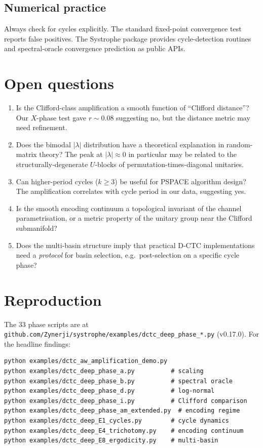 \documentclass[11pt,a4paper]{article}
\begin{document}
\subsection{Numerical practice}

Always check for cycles explicitly. The standard fixed-point
convergence test reports false positives. The Systrophe package
provides cycle-detection routines and spectral-oracle convergence
prediction as public APIs.

\section{Open questions}

\begin{enumerate}
\item Is the Clifford-class amplification a smooth function of
``Clifford distance''? Our $X$-phase test gave $r \sim 0.08$
suggesting no, but the distance metric may need refinement.

\item Does the bimodal $|\lambda|$ distribution have a theoretical
explanation in random-matrix theory? The peak at $|\lambda| \approx 0$
in particular may be related to the structurally-degenerate
$U$-blocks of permutation-times-diagonal unitaries.

\item Can higher-period cycles ($k \ge 3$) be useful for PSPACE
algorithm design? The amplification correlates with cycle period in
our data, suggesting yes.

\item Is the smooth encoding continuum a topological invariant of
the channel parametrisation, or a metric property of the unitary
group near the Clifford submanifold?

\item Does the multi-basin structure imply that practical D-CTC
implementations need a \emph{protocol} for basin selection, e.g.\
post-selection on a specific cycle phase?
\end{enumerate}

\section{Reproduction}

The 33 phase scripts are at
\texttt{github.com/Zynerji/systrophe/examples/dctc\_deep\_phase\_*.py}
(v0.17.0). For the headline findings:

\begin{verbatim}
python examples/dctc_aw_amplification_demo.py
python examples/dctc_deep_phase_a.py          # scaling
python examples/dctc_deep_phase_b.py          # spectral oracle
python examples/dctc_deep_phase_d.py          # log-normal
python examples/dctc_deep_phase_i.py          # Clifford comparison
python examples/dctc_deep_phase_am_extended.py  # encoding regime
python examples/dctc_deep_E1_cycles.py        # cycle dynamics
python examples/dctc_deep_E4_trichotomy.py    # encoding continuum
python examples/dctc_deep_E8_ergodicity.py    # multi-basin
\end{verbatim}
\end{document}
